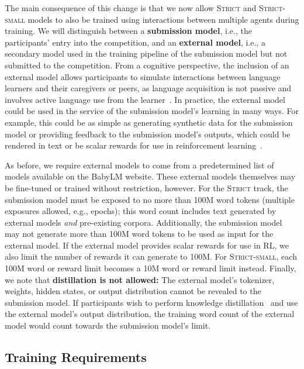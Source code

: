 \documentclass[11pt]{article}
\newcommand{\strict}[1]{\textsc{Strict}}
\newcommand{\strictsmall}[1]{\textsc{Strict-small}}
\begin{document}
The main consequence of this change is that we now allow \strict{} and \strictsmall{} models to also be trained using interactions between multiple agents during training.
We will distinguish between a \textbf{submission model}, i.e., the participants' entry into the competition, and an \textbf{external model}, i.e., a secondary model used in the training pipeline of the submission model but not submitted to the competition.
From a cognitive perspective, the inclusion of an external model allows participants to simulate interactions between language learners and their caregivers or peers, as language acquisition is not passive and involves active language use from the learner~\citep{bruner1985child, clark2020conversational}. In practice, the external model could be used in the service of the submission model's learning in many ways. For example, this could be as simple as generating synthetic data for the submission model or providing feedback to the submission model's outputs, which could be rendered in text or be scalar rewards for use in reinforcement learning~\citep{martins2025once}.

As before, we require external models to come from a predetermined list of models available on the BabyLM website. These external models themselves may be fine-tuned or trained without restriction, however. For the \strict{} track, the submission model must be exposed to no more than 100M word tokens (multiple exposures allowed, e.g., epochs); this word count includes text generated by external models \textit{and} pre-existing corpora. Additionally, the submission model may not generate more than 100M word tokens to be used as input for the external model. If the external model provides scalar rewards for use in RL, we also limit the number of rewards it can generate to 100M. For \strictsmall{}, each 100M word or reward limit becomes a 10M word or reward limit instead. Finally, we note that \textbf{distillation is not allowed:} The external model's tokenizer, weights, hidden states, or output distribution cannot be revealed to the submission model. If participants wish to perform knowledge distillation~\citep{hinton2015distilling} and use the external model's output distribution, the training word count of the external model would count towards the submission model's limit.


\subsection{Training Requirements}\label{sec:training-requirements} %
\end{document}
